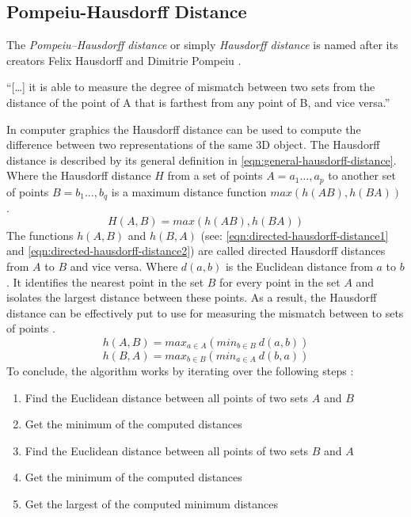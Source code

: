 \subsection{Pompeiu-Hausdorff Distance}
The \textit{Pompeiu–Hausdorff distance} or simply \textit{Hausdorff distance} is named after its creators Felix Hausdorff and Dimitrie Pompeiu \cite{birsanOneHundredYears2006}.
\begin{displayquote}
	``[\ldots] it is able to measure the degree of mismatch between two sets from the distance of the point of A that is farthest from any point of B, and vice versa.''
\end{displayquote}
In computer graphics the Hausdorff distance can be used to compute the difference between two representations of the same 3D object.
The Hausdorff distance is described by its general definition in \cref{eqn:general-hausdorff-distance}.
Where the Hausdorff distance $H$ from a set of points $A={a_{1}\ldots,a_{p}}$ to another set of points $B={b_{1}\ldots,b_{q}}$ is a maximum distance function $max(h(AB),h(BA))$ \cite{hausdorffGrundzuegeMengenlehre1978,simBrainVentricleDetection2016,gegoireHausdorffDistanceConvex1998}.
\begin{equation}\label{eqn:general-hausdorff-distance}
	H(A,B)=max(h(AB),h(BA))
\end{equation}
The functions $h(A,B)$ and $h(B,A)$ (see: \cref{eqn:directed-hausdorff-distance1} and \cref{eqn:directed-hausdorff-distance2}) are called directed Hausdorff distances from $A$ to $B$ and vice versa.
Where $d(a,b)$ is the Euclidean distance from $a$ to $b$.
It identifies the nearest point in the set $B$ for every point in the set $A$ and isolates the largest distance between these points.
As a result, the Hausdorff distance can be effectively put to use for measuring the mismatch between to sets of points \cite{hausdorffGrundzuegeMengenlehre1978,simBrainVentricleDetection2016,gegoireHausdorffDistanceConvex1998}.
\begin{equation}\label{eqn:directed-hausdorff-distance1}
	h(A,B)=max_{a \in A}(min_{b \in B}\ d(a,b))
\end{equation}
\begin{equation}\label{eqn:directed-hausdorff-distance2}
	h(B,A)=max_{b \in B}(min_{a \in A}\ d(b,a))
\end{equation}
To conclude, the algorithm works by iterating over the following steps \cite{hausdorffGrundzuegeMengenlehre1978,simBrainVentricleDetection2016,gegoireHausdorffDistanceConvex1998}:
\begin{enumerate}
	\item Find the Euclidean distance between all points of two sets $A$ and $B$
	\item Get the minimum of the computed distances
	\item Find the Euclidean distance between all points of two sets $B$ and $A$
	\item Get the minimum of the computed distances
	\item Get the largest of the computed minimum distances
\end{enumerate}



